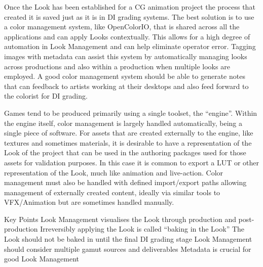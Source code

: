 Once the Look has been established for a CG animation project the process that created it is saved just as it is in DI grading systems. The best solution is to use a color management system, like OpenColorIO, that is shared across all the applications and can apply Looks contextually. This allows for a high degree of automation in Look Management and can help eliminate operator error. Tagging images with metadata can assist this system by automatically managing looks across productions and also within a production when multiple looks are employed. A good color management system should be able to generate notes that can feedback to artists working at their desktops and also feed forward to the colorist for DI grading.

Games tend to be produced primarily using a single toolset, the “engine”. Within the engine itself, color management is largely handled automatically, being a single piece of software. For assets that are created externally to the engine, like textures and sometimes materials, it is desirable to have a representation of the Look of the project that can be used in the authoring packages used for those assets for validation purposes. In this case it is common to export a LUT or other representation of the Look, much like animation and live-action. Color management must also be handled with defined import/export paths allowing management of externally created content, ideally via similar tools to VFX/Animation but are sometimes handled manually.

Key Points
Look Management visualises the Look through production and post-production
Irreversibly applying the Look is called “baking in the Look”
The Look should not be baked in until the final DI grading stage
Look Management should consider multiple gamut sources and deliverables
Metadata is crucial for good Look Management


